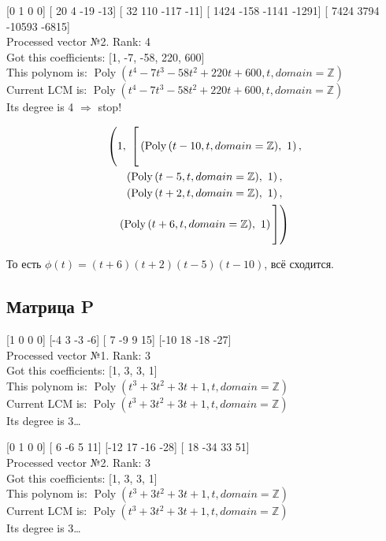 \documentclass[12pt, a4paper]{article}
\begin{document}
    [0 1 0 0] [ 20   4 -19 -13] [  32  110 -117  -11] [ 1424  -158 -1141 -1291] [  7424   3794 -10593  -6815] \\
    Processed vector №2. Rank: 4\\
    Got this coefficients: [1, -7, -58, 220, 600]\\
    This polynom is: $\operatorname{Poly}{\left( t^{4} - 7 t^{3} - 58 t^{2} + 220 t + 600, t, domain=\mathbb{Z} \right)}$\\
    Current LCM is: $\operatorname{Poly}{\left( t^{4} - 7 t^{3} - 58 t^{2} + 220 t + 600, t, domain=\mathbb{Z} \right)}$\\
    Its degree is 4 $\Rightarrow$ stop!
    
    \begin{multline}
        \biggg( 1, \  \biggg[ 
            \left( \operatorname{Poly}{\left( t - 10, t, domain=\mathbb{Z} \right)}, \  1\right), \\
            \left( \operatorname{Poly}{\left( t - 5, t, domain=\mathbb{Z} \right)}, \  1\right), \\
            \left( \operatorname{Poly}{\left( t + 2, t, domain=\mathbb{Z} \right)}, \  1\right), \\
            \left( \operatorname{Poly}{\left( t + 6, t, domain=\mathbb{Z} \right)}, \  1\right)
            \biggg]\biggg)
    \end{multline}
    
    То есть $\phi(t) = (t + 6)(t + 2)(t - 5)(t- 10)$, всё сходится.

    \subsection{Матрица P}

    [1 0 0 0] [-4  3 -3 -6] [ 7 -9  9 15] [-10  18 -18 -27] \\
    Processed vector №1. Rank: 3\\
    Got this coefficients: [1, 3, 3, 1]\\
    This polynom is: $\operatorname{Poly}{\left( t^{3} + 3 t^{2} + 3 t + 1, t, domain=\mathbb{Z} \right)}$\\
    Current LCM is: $\operatorname{Poly}{\left( t^{3} + 3 t^{2} + 3 t + 1, t, domain=\mathbb{Z} \right)}$\\
    Its degree is 3…

    [0 1 0 0] [ 6 -6  5 11] [-12  17 -16 -28] [ 18 -34  33  51] \\
    Processed vector №2. Rank: 3\\
    Got this coefficients: [1, 3, 3, 1]\\
    This polynom is: $\operatorname{Poly}{\left( t^{3} + 3 t^{2} + 3 t + 1, t, domain=\mathbb{Z} \right)}$\\
    Current LCM is: $\operatorname{Poly}{\left( t^{3} + 3 t^{2} + 3 t + 1, t, domain=\mathbb{Z} \right)}$\\
    Its degree is 3…
\end{document}
